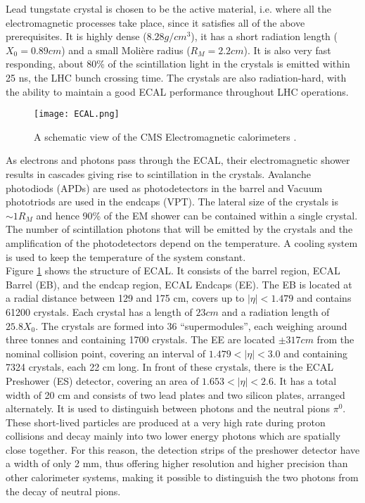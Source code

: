 \indent Lead tungstate crystal is chosen to be the active material, i.e. where all the electromagnetic processes take place, since it satisfies all of the above prerequisites. It is highly dense ($8.28 g/cm^3$), it has a short radiation length ($X_0 = 0.89 cm$) and a small Molière radius ($R_M = 2.2 cm$). It is also very fast responding, about 80\% of the scintillation light in the crystals is emitted within 25 ns, the LHC bunch crossing time. The crystals are also radiation-hard, with the ability to maintain a good ECAL performance throughout LHC operations.
\begin{figure}[H]
    \centering
    \texttt{[image: ECAL.png]}
    \caption{A schematic view of the CMS Electromagnetic calorimeters \cite{ECAL}.}
    \label{fig:ECAL}
\end{figure}
\indent As electrons and photons pass through the ECAL, their electromagnetic shower results in cascades giving rise to scintillation in the crystals. Avalanche photodiods (APDs) are used as photodetectors in the barrel and Vacuum phototriods are used in the endcaps (VPT). The lateral size of the crystals is $\sim 1R_M$ and hence 90\% of the EM shower can be contained within a single crystal. The number of scintillation photons that will be emitted by the crystals and the amplification of the photodetectors depend on the temperature. A cooling system is used to keep the temperature of the system constant.\\
\indent Figure \ref{fig:ECAL} shows the structure of ECAL. It consists of the barrel region, ECAL Barrel (EB), and the endcap region, ECAL Endcaps (EE). The EB is located at a radial distance between 129 and 175 cm, covers up to $|\eta| < 1.479$ and contains 61200 crystals. Each crystal has a length of $23 cm$ and a radiation length of $25.8 X_0$. The crystals are formed into 36 “supermodules”, each weighing around three tonnes and containing 1700 crystals. The EE are located $\pm 317 cm$ from the nominal collision point, covering an interval of $1.479 < |\eta| < 3.0$ and containing 7324 crystals, each 22 cm long. In front of these crystals, there is the ECAL Preshower (ES) detector, covering an area of $1.653 < |\eta| < 2.6$. It has a total width of 20 cm and consists of two lead plates and two silicon plates, arranged alternately. It is used to distinguish between photons and the neutral pions $\pi^0$. These short-lived particles are produced at a very high rate during proton collisions and decay mainly into two lower energy photons which are spatially close together. For this reason, the detection strips of the preshower detector have a width of only 2 mm, thus offering higher resolution and higher precision than other calorimeter systems, making it possible to distinguish the two photons from the decay of neutral pions.\\
